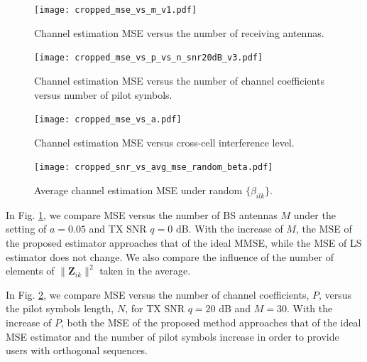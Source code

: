 \documentclass[10pt,journal,comsoc,final]{IEEEtran}
\begin{document}
\begin{figure}[b]
\vspace{-4mm}
\centering
\texttt{[image: cropped\_mse\_vs\_m\_v1.pdf]}
\caption{Channel estimation MSE versus the number of receiving antennas.}
\label{fig:antennas_vs_mse}
\end{figure}

\begin{figure}[t]
\centering
\texttt{[image: cropped\_mse\_vs\_p\_vs\_n\_snr20dB\_v3.pdf]}
\caption{Channel estimation MSE versus the number of channel coefficients versus number of pilot symbols.}
\label{fig:mse_vs_p_vs_n}
\vspace{-4mm}
\end{figure}

\begin{figure}[b]
\vspace{-4mm}
\centering
\texttt{[image: cropped\_mse\_vs\_a.pdf]}
\caption{Channel estimation MSE versus cross-cell interference level.}
\label{fig:mse_vs_a}
\end{figure}

\begin{figure}[t]
\centering
\texttt{[image: cropped\_snr\_vs\_avg\_mse\_random\_beta.pdf]}
\caption{Average channel estimation MSE under random $\{\beta_{ilk}\}$.}
\label{fig:snr_vs_mse_random_beta}
\vspace{-5mm}
\end{figure}

In Fig. \ref{fig:antennas_vs_mse}, we compare MSE versus the number of BS antennas $M$ under the setting of $a = 0.05$ and TX SNR $q = 0$ dB. With the increase of $M$, the MSE of the proposed estimator approaches that of the ideal MMSE, while the MSE of LS estimator does not change. We also compare the influence of the number of elements of $\lVert \textbf{Z}_{ik} \rVert^{2}$ taken in the average.

In Fig. \ref{fig:mse_vs_p_vs_n}, we compare MSE versus the number of channel coefficients, $P$, versus the pilot symbols length, $N$, for TX SNR $q = 20$ dB and $M = 30$. With the increase of $P$, both the MSE of the proposed method approaches that of the ideal MSE estimator and the number of pilot symbols increase in order to provide users with orthogonal sequences.
\end{document}

